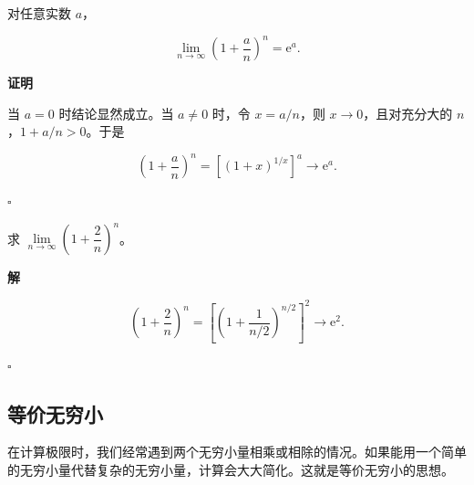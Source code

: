 \documentclass[fontset=fandol]{ctexart}
\newenvironment{proofdetail}{\par\noindent\textbf{证明}\quad}{\hfill$\square$\par\vspace{0.8em}}
\newenvironment{solution}{\par\noindent\textbf{解}\quad}{\hfill$\square$\par\vspace{0.8em}}
\newcommand{\ee}{\mathrm{e}}
\begin{document}
\begin{theorem}[第二个重要极限的离散推广]

对任意实数 \(a\)，

\[

\lim_{n\to\infty}\left(1+\frac an\right)^n=\ee^a.

\]

\end{theorem}

\begin{proofdetail}

当 \(a=0\) 时结论显然成立。当 \(a\neq0\) 时，令 \(x=a/n\)，则 \(x\to0\)，且对充分大的 \(n\)，\(1+a/n>0\)。于是

\[

\left(1+\frac an\right)^n

=\left[(1+x)^{1/x}\right]^a\longrightarrow\ee^a.

\]

\end{proofdetail}





\begin{example}

	求 \(\lim\limits_{n\to\infty} \left(1 + \dfrac{2}{n}\right)^n\)。

\end{example}

\begin{solution}

	\[

	\left(1 + \dfrac{2}{n}\right)^n = \left[\left(1 + \dfrac{1}{n/2}\right)^{n/2}\right]^2 \to \ee^2.

	\]

\end{solution}



\subsection{等价无穷小}



在计算极限时，我们经常遇到两个无穷小量相乘或相除的情况。如果能用一个简单的无穷小量代替复杂的无穷小量，计算会大大简化。这就是等价无穷小的思想。
\end{document}
